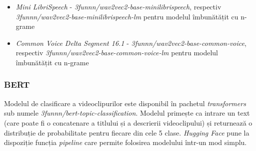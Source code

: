 \begin{itemize}
    \item \textit{Mini LibriSpeech} - \textit{3funnn/wav2vec2-base-minilibrispeech}, respectiv \textit{3funnn/wav2vec2-base-minilibrispeech-lm} 
    pentru modelul îmbunătățit cu n-grame
    \item \textit{Common Voice Delta Segment 16.1} - \textit{3funnn/wav2vec2-base-common-voice}, respectiv \textit{3funnn/wav2vec2-base-common-voice-lm}
    pentru modelul îmbunătățit cu n-grame
\end{itemize}

\subsubsection{BERT}
Modelul de clasificare a videoclipurilor este disponibil în pachetul \textit{transformers} sub numele
\textit{3funnn/bert-topic-classification}. Modelul primește ca intrare un text (care poate fi o 
concatenare a titlului și a descrierii videoclipului) și returnează o distribuție de probabilitate
pentru fiecare din cele 5 clase. \textit{Hugging Face} pune la dispoziție funcția \textit{pipeline} care
permite folosirea modelului într-un mod simplu.

